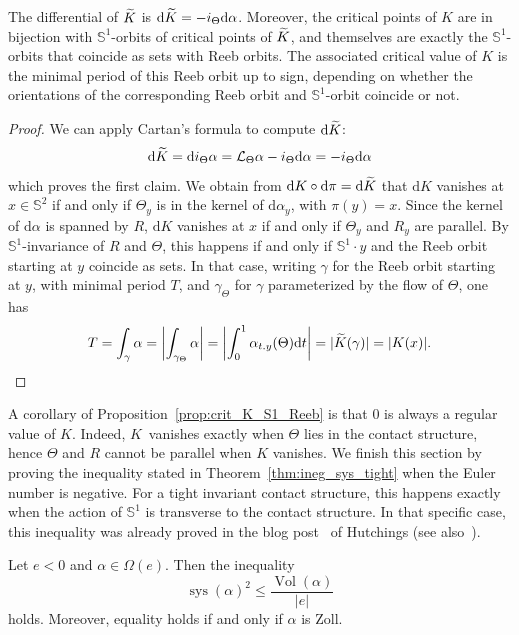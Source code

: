 \documentclass[AHL,Unicode,longabstracts]{cedram}
\DeclareMathOperator{\vol}{Vol}
\DeclareMathOperator{\sys}{sys}
\newcommand{\bbS}{\mathbb{S}}
\newcommand{\clL}{\mathcal{L}}
\newcommand{\rmd}{\mathrm{d}}
\let\oldtilde\tilde
\renewcommand*{\tilde}[1]{\mathchoice{\widetilde{#1}}{\widetilde{#1}}{\oldtilde{#1}}{\oldtilde{#1}}}
\newcommand{\bbS}{\mathbb{S}}
\begin{document}
\begin{prop}\label{prop:crit_K_S1_Reeb}
The differential of $\tilde K$ is $\rmd \tilde K = - i_\Theta \rmd \alpha$. Moreover, the critical points of $K$ are in bijection with $\bbS^1$-orbits of critical points of $\tilde K$, and themselves are exactly the $\bbS^1$-orbits that coincide as sets with Reeb orbits. The associated critical value of $K$ is the minimal period of this Reeb orbit up to sign, depending on whether the orientations of the corresponding Reeb orbit and $\bbS^1$-orbit coincide or not.
\end{prop}

\begin{proof}
We can apply Cartan's formula to compute $\rmd \tilde K$:
\[
\rmd \tilde K = \rmd i_{\Theta}\alpha = \clL_{\Theta} \alpha - i_{\Theta}\rmd \alpha = - i_{\Theta}\rmd \alpha
\]
which proves the first claim. We obtain from $\rmd K \circ \rmd \pi = \rmd \tilde K$ that $\rmd K$ vanishes at $x \in \bbS^2$ if and only if $\Theta_y$ is in the kernel of $\rmd \alpha_y$, with $\pi(y) = x$. Since the kernel of $\rmd \alpha$ is spanned by $R$, $\rmd K$ vanishes at $x$ if and only if $\Theta_y$ and $R_y$ are parallel. By $\bbS^1$-invariance of $R$ and $\Theta$, this happens if and only if $\bbS^1\cdot y$ and the Reeb orbit starting at $y$ coincide as sets. In that case, writing $\gamma$ for the Reeb orbit starting at $y$, with minimal period $T$, and $\gamma_\Theta$ for $\gamma$ parameterized by the flow of $\Theta$, one has
\[
T = \int_\gamma \alpha = \left| \int_{\gamma_\Theta} \alpha\right| = \left| \int_{0}^{1} \alpha_{t.y}(\Theta) \rmd t\right| = |\tilde K(\gamma)| = |K(x)|.\qedhere
\]
\end{proof}

A corollary of Proposition~\ref{prop:crit_K_S1_Reeb} is that $0$ is always a regular value of $K$. Indeed, $K$~vanishes exactly when $\Theta$ lies in the contact structure, hence $\Theta$ and $R$ cannot be parallel when $K$ vanishes. We finish this section by proving the inequality stated in Theorem~\ref{thm:ineg_sys_tight} when the Euler number is negative. For a tight invariant contact structure, this happens exactly when the action of $\bbS^1$ is transverse to the contact structure. In that specific case, this inequality was already proved in the blog post~\cite{hutchings_2013} of Hutchings (see also~\cite[Proposition~1.4]{MR4413022}).

\begin{prop}\label{prop:ineg_sys_facile}
Let $e<0$ and $\alpha \in \Omega(e)$. Then the inequality
\[
\sys(\alpha)^2 \leq \frac{\vol(\alpha)}{|e|}
\]
holds. Moreover, equality holds if and only if $\alpha$ is Zoll.
\end{prop}
\end{document}
